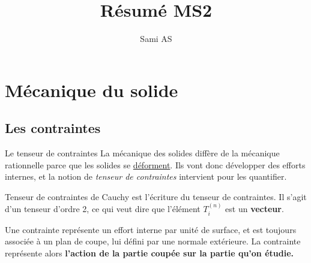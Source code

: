 \documentclass[10pt]{beamer}
\author{Sami AS}
\title{Résumé MS2}
\begin{document}
\begin{frame}
\titlepage
\end{frame}

\begin{frame}
\tableofcontents
\end{frame}
\section{Mécanique du solide}
\subsection{Les contraintes}
\begin{frame}{Le tenseur de contraintes}
La mécanique des solides diffère de la mécanique rationnelle parce que les solides se \underline{déforment}. Ils vont donc développer des efforts internes, et la notion de \textit{tenseur de contraintes} intervient pour les quantifier.
\begin{block}{Tenseur de contraintes de Cauchy}
 est l'écriture du tenseur de contraintes. Il s'agit d'un tenseur d'ordre 2, ce qui veut dire que l'élément $T_i^{(n)}$ est un \textbf{vecteur}.
\end{block}
Une contrainte représente un effort interne par unité de surface, et est toujours associée à un plan de coupe, lui défini par une normale extérieure. La contrainte représente alors \textbf{l'action de la partie coupée sur la partie qu'on étudie.}
\end{frame}
\end{document}
